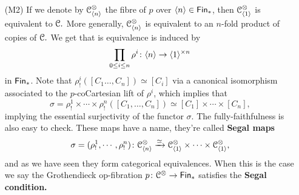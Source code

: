 \begin{construction}
\begin{enumerate}
    \item[(M2)]\label{monoidal char2} If we denote by $\mathcal C^{\otimes}_{\langle n \rangle}$ the fibre of $p$ over $\langle n \rangle\in \operatorname{\sf Fin}_\ast$, then $\mathcal C^{\otimes}_{\langle 1 \rangle}$ is equivalent to $\mathcal C.$ More generally, $\mathcal C^{\otimes}_{\langle n \rangle}$ is equivalent to an $n$-fold product of copies of $\mathcal C.$ We get that is equivalence is induced by \[\prod_{0\leq i \leq n}\rho^{i}\colon \langle n \rangle \rightarrow \langle 1 \rangle^{\times n}\] in $\operatorname{\sf Fin}_\ast$. Note that $\rho^{i}_!([C_{1}\ldots,C_n]) \simeq [C_{i}]$ via a canonical isomorphism associated to the $p$-coCartesian lift of $\rho^i$, which implies that $$\sigma = \rho^{1}_!\times \cdots \times\rho^{n}_!([C_1,\ldots,C_n])\simeq [C_1]\times\cdots \times [C_{n}],$$ implying the essential surjectivity of the functor $\sigma$. The fully-faithfulness is also easy to check.
    These maps have a name, they're called \textbf{Segal maps} \[\sigma = (\rho^{1}_!,\cdots,\rho^{n}_!)\colon \mathcal C^{\otimes}_{\langle n\rangle} \xrightarrow{\simeq} \mathcal C^{\otimes}_{\langle 1 \rangle }\times \cdots \times \mathcal C_{\langle 1 \rangle}^{\otimes},\] and as we have seen they form categorical equivalences. When this is the case we say the Grothendieck op-fibration $p\colon \mathcal C^{\otimes} \rightarrow \operatorname{\sf Fin}_\ast$ satisfies the \textbf{Segal condition.} 
    \end{enumerate}


\end{construction}
